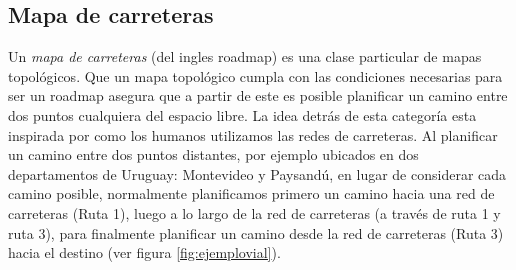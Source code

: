 



\subsection{Mapa de carreteras}\label{subsec:mapacarr}
Un \emph{mapa de carreteras} (del ingles roadmap) \cite{choset2005principles} es una clase particular de mapas topológicos. Que un mapa topológico cumpla con las condiciones necesarias para ser un roadmap asegura que a partir de este es posible planificar un camino entre dos puntos cualquiera del espacio libre. La idea detrás de esta categoría esta inspirada por como los humanos utilizamos las redes de carreteras. Al planificar un camino entre dos puntos distantes, por ejemplo ubicados en dos departamentos de Uruguay: Montevideo y Paysandú, en lugar de considerar cada camino posible, normalmente planificamos primero un camino hacia una red de carreteras (Ruta 1), luego a lo largo de la red de carreteras (a través de ruta 1 y ruta 3), para finalmente planificar un camino desde la red de carreteras (Ruta 3) hacia el destino (ver figura \ref{fig:ejemplovial}). 

